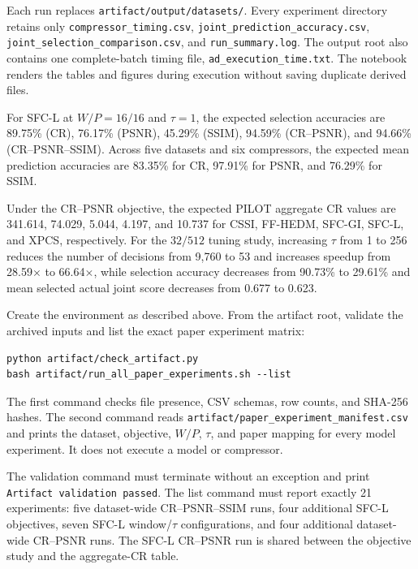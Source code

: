 \artout
Each run replaces \texttt{artifact/output/datasets/}. Every experiment
directory retains only \texttt{compressor\_timing.csv},
\texttt{joint\_prediction\_accuracy.csv},
\texttt{joint\_selection\_comparison.csv}, and
\texttt{run\_summary.log}. The output root also contains one complete-batch
timing file, \texttt{ad\_execution\_time.txt}. The notebook renders the tables
and figures during execution without saving duplicate derived files.

For SFC-L at $W/P=16/16$ and $\tau=1$, the expected selection accuracies are
89.75\% (CR), 76.17\% (PSNR), 45.29\% (SSIM), 94.59\% (CR--PSNR), and 94.66\%
(CR--PSNR--SSIM). Across five datasets and six compressors, the expected mean
prediction accuracies are 83.35\% for CR, 97.91\% for PSNR, and 76.29\% for
SSIM.

Under the CR--PSNR objective, the expected PILOT aggregate CR values are
341.614, 74.029, 5.044, 4.197, and 10.737 for CSSI, FF-HEDM, SFC-GI, SFC-L, and
XPCS, respectively. For the $32/512$ tuning study, increasing $\tau$ from 1 to
256 reduces the number of decisions from 9,760 to 53 and increases speedup
from 28.59$\times$ to 66.64$\times$, while selection accuracy decreases from
90.73\% to 29.61\% and mean selected actual joint score decreases from 0.677
to 0.623.

\clearpage
\appendixAE

\artin
Create the environment as described above. From the artifact root, validate the
archived inputs and list the exact paper experiment matrix:
\begin{verbatim}
python artifact/check_artifact.py
bash artifact/run_all_paper_experiments.sh --list
\end{verbatim}

\artcomp
The first command checks file presence, CSV schemas, row counts, and SHA-256
hashes. The second command reads
\texttt{artifact/paper\_experiment\_manifest.csv} and prints the dataset,
objective, $W/P$, $\tau$, and paper mapping for every model experiment. It does
not execute a model or compressor.

\artout
The validation command must terminate without an exception and print
\texttt{Artifact validation passed}. The list command must report exactly 21
experiments: five dataset-wide CR--PSNR--SSIM runs, four additional SFC-L
objectives, seven SFC-L window/$\tau$ configurations, and four additional
dataset-wide CR--PSNR runs. The SFC-L CR--PSNR run is shared between the
objective study and the aggregate-CR table.

